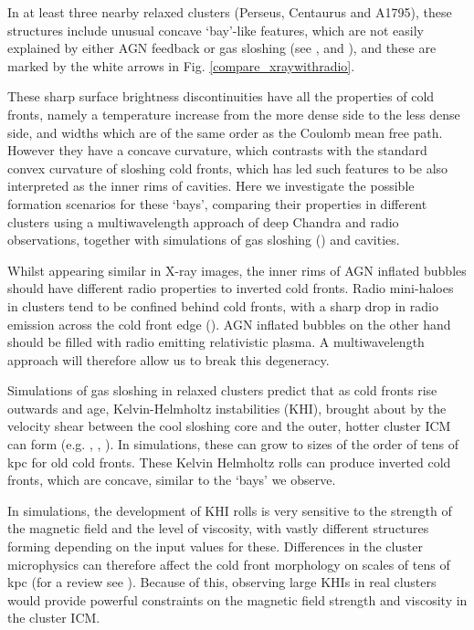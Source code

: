 \documentclass[useAMS,usenatbib]{mn2e}
\begin{document}
In at least three nearby relaxed clusters (Perseus, Centaurus and A1795), these structures
include
unusual concave `bay'-like features, which are not easily explained by either AGN
feedback or gas sloshing (see \citealt{Fabian2006}, \citealt{Sanders2016} and
\citealt{Walker2014_A1795}), and these are marked by the white arrows in Fig. \ref{compare_xraywithradio}.

 These sharp surface brightness discontinuities have
all the properties of cold fronts, namely a temperature increase from the more
dense side to the less dense side, and widths which are of the same order as the
Coulomb mean free path. However they have a concave curvature, which contrasts with the standard convex curvature of sloshing cold fronts,
which has led such features to be also interpreted as the inner rims of
cavities. Here we investigate the possible formation scenarios for these
`bays', comparing their properties in different clusters using a multiwavelength approach of deep Chandra
and radio observations, together with simulations of gas sloshing (\citealt{ZuHone2016}) and cavities. 

Whilst appearing similar in X-ray images, the inner rims of AGN inflated bubbles should have different radio properties to 
inverted cold fronts. Radio mini-haloes in clusters tend to be confined behind cold fronts, with a sharp drop in radio 
emission across the cold front edge (\citealt{Mazzotta2008}). AGN inflated bubbles on the other hand should be filled with 
radio emitting relativistic plasma. A multiwavelength approach will therefore allow us to break this degeneracy.     

Simulations of gas sloshing in relaxed clusters predict that as cold fronts rise
outwards and age, Kelvin-Helmholtz instabilities (KHI), brought about by the velocity
shear between the cool sloshing core and the outer, hotter cluster ICM can form (e.g. \citealt{ZuHone2011}, \citealt{Roediger2012}, \citealt{Roediger2013}).
In simulations, these can grow to sizes of the order of tens of kpc for old cold
fronts. These Kelvin Helmholtz rolls can produce inverted cold fronts, which are concave, similar to the `bays' we observe.

In simulations, the development of KHI rolls is very sensitive to the strength of the magnetic field and the level of viscosity, 
with vastly different structures forming depending on the input values for these. Differences in the cluster microphysics 
can therefore affect the cold front morphology on scales of tens of kpc (for a review see \citealt{Zuhone2016review}).
Because of this, observing large KHIs in real clusters would provide powerful constraints on the 
magnetic field strength and viscosity in the cluster ICM.  
\end{document}
